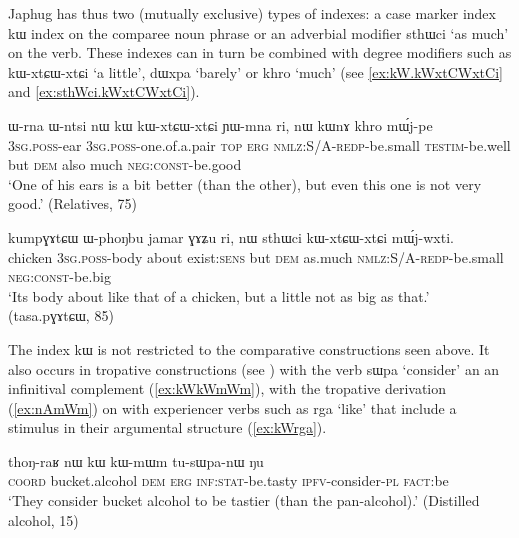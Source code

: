 \documentclass[oldfontcommands,oneside,a4paper,11pt]{article}
\newcommand{\ipa}[1]{{\phon #1}} %
\begin{document}
Japhug has thus two (mutually exclusive) types of indexes: a case marker index \ipa{kɯ} index on the comparee noun phrase or an adverbial modifier \ipa{sthɯci} `as much' on the verb. These indexes can in turn be combined with degree modifiers such as \ipa{kɯ-xtɕɯ-xtɕi} `a little', \ipa{dɯxpa} `barely' or \ipa{khro} `much' (see \ref{ex:kW.kWxtCWxtCi} and \ref{ex:sthWci.kWxtCWxtCi}).
  
    \begin{exe}
\ex \label{ex:kW.kWxtCWxtCi}
\gll 
  \ipa{ɯ-rna}  	\ipa{ɯ-ntsi}  	\ipa{nɯ}  	\ipa{kɯ}  	\ipa{kɯ-xtɕɯ-xtɕi}  	\ipa{ɲɯ-mna}  	\ipa{ri,}  	\ipa{nɯ}  	\ipa{kɯnɤ}  	\ipa{khro}  	\ipa{mɯ́j-pe}  \\
  \textsc{3sg.poss}-ear \textsc{3sg.poss}-one.of.a.pair \textsc{top} \textsc{erg} \textsc{nmlz:S/A-redp}-be.small \textsc{testim}-be.well but \textsc{dem} also much \textsc{neg:const}-be.good \\
  \glt `One of his ears is a bit better (than the other), but even this one is not very good.' (Relatives, 75)
  \end{exe}
 
     \begin{exe}
\ex \label{ex:sthWci.kWxtCWxtCi}
\gll 
  \ipa{kumpɣɤtɕɯ}  	\ipa{ɯ-phoŋbu}  	\ipa{jamar}  	\ipa{ɣɤʑu}  	\ipa{ri,}  	\ipa{nɯ}  	\ipa{sthɯci}  	\ipa{kɯ-xtɕɯ-xtɕi}  	\ipa{mɯ́j-wxti.}  \\
  chicken \textsc{3sg.poss}-body about exist:\textsc{sens} but \textsc{dem} as.much \textsc{nmlz:S/A-redp}-be.small \textsc{neg:const}-be.big \\
\glt `Its body about like that of a chicken, but a little not as big as that.' (tasa.pɣɤtɕɯ, 85)
  \end{exe}

 
The index \ipa{kɯ} is not restricted to the comparative constructions seen above. It also occurs in  tropative constructions (see \citealt{jacques13tropative}) with the verb \ipa{sɯpa} `consider' an an infinitival complement (\ref{ex:kWkWmWm}), with the tropative derivation (\ref{ex:nAmWm}) on with experiencer verbs such as \ipa{rga} `like' that include  a stimulus in their argumental structure (\ref{ex:kWrga}).

\begin{exe}
\ex \label{ex:kWkWmWm}
\gll  \ipa{tɕe}   	\ipa{thoŋ-raʁ}   	\ipa{nɯ}   	\ipa{kɯ}   	\ipa{kɯ-mɯm}   	\ipa{tu-sɯpa-nɯ}   	\ipa{ŋu}   \\
\textsc{coord} bucket.alcohol \textsc{dem} \textsc{erg} \textsc{inf:stat}-be.tasty \textsc{ipfv}-consider-\textsc{pl} \textsc{fact}:be \\
\glt `They consider  bucket alcohol to be tastier (than the pan-alcohol).' (Distilled alcohol, 15)
\end{exe}
\end{document}
